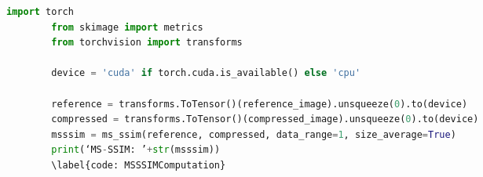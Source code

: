 \begin{adjustbox}{max width=\textwidth}   
    \begin{lstlisting}[language=Python, caption=Spezzone di codice per il calcolo dell'MS-SSIM, label=code:MSSSIMComputation]
        import torch
        from skimage import metrics
        from torchvision import transforms
        
        device = 'cuda' if torch.cuda.is_available() else 'cpu'
        
        reference = transforms.ToTensor()(reference_image).unsqueeze(0).to(device)
        compressed = transforms.ToTensor()(compressed_image).unsqueeze(0).to(device)
        msssim = ms_ssim(reference, compressed, data_range=1, size_average=True)
        print(‘MS-SSIM: ’+str(msssim))
        \label{code: MSSSIMComputation}
    \end{lstlisting}
\end{adjustbox} 


